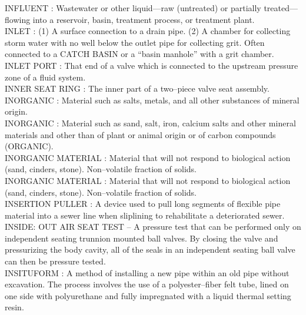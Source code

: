 \vspace{0.15cm}
INFLUENT :  Wastewater or other liquid—raw (untreated) or partially treated—flowing into a reservoir, basin, treatment process, or treatment plant. \\
\vspace{0.15cm}
INLET :  (1) A surface connection to a drain pipe. (2) A chamber for collecting storm water with no well below the outlet pipe for collecting grit. Often connected to a CATCH BASIN or a “basin manhole” with a grit chamber. \\
\vspace{0.15cm}
INLET PORT :   That end of a valve which is connected to the upstream pressure zone of a fluid system.\\
\vspace{0.15cm}
INNER SEAT RING :   The inner part of a two–piece valve seat assembly.\\
\vspace{0.15cm}
INORGANIC :  Material such as salts, metals, and all other substances of mineral origin. \\
\vspace{0.15cm}
INORGANIC :  Material such as sand, salt, iron, calcium salts and other mineral materials and other than of plant or animal origin or of carbon compounds (ORGANIC).\\
\vspace{0.15cm}
INORGANIC MATERIAL :   Material that will not respond to biological action (sand, cinders, stone). Non–volatile fraction of solids.\\
\vspace{0.15cm}
INORGANIC MATERIAL :  Material that will not respond to biological action (sand, cinders, stone). Non–volatile fraction of solids.\\
\vspace{0.15cm}
INSERTION PULLER :  A device used to pull long segments of flexible pipe material into a sewer line when sliplining to rehabilitate a deteriorated sewer. \\
\vspace{0.15cm}
INSIDE: OUT AIR SEAT TEST –  A pressure test that can be performed only on independent seating trunnion mounted ball valves. By closing the valve and pressurizing the body cavity, all of the seals in an independent seating ball valve can then be pressure tested.\\
\vspace{0.15cm}
INSITUFORM :  A method of installing a new pipe within an old pipe without excavation. The process involves the use of a polyester–fiber felt tube, lined on one side with polyurethane and fully impregnated with a liquid thermal setting resin. \\

